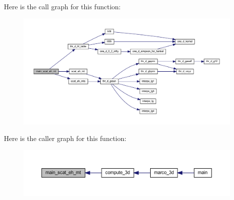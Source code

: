 Here is the call graph for this function\+:
\nopagebreak
\begin{figure}[H]
\begin{center}
\leavevmode
\includegraphics[width=350pt]{Marco_8f90_a691701461b67027619c9ea8471ee24ea_cgraph}
\end{center}
\end{figure}
Here is the caller graph for this function\+:
\nopagebreak
\begin{figure}[H]
\begin{center}
\leavevmode
\includegraphics[width=350pt]{Marco_8f90_a691701461b67027619c9ea8471ee24ea_icgraph}
\end{center}
\end{figure}
\mbox{\label{Marco_8f90_a212d574f24aa10a6e92151f2b35d968e}} 

